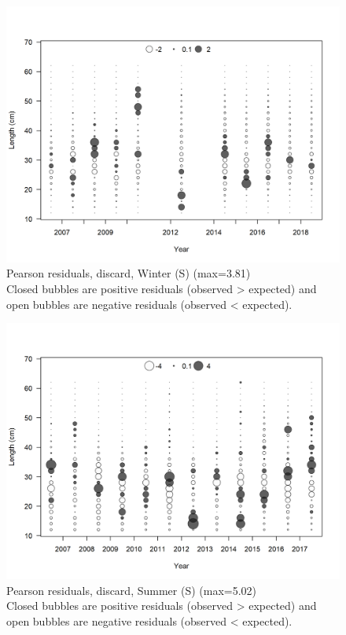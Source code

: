 \documentclass[12pt,]{article}
\begin{document}
\begin{figure}
\centering
\includegraphics{r4ss/plots_mod1/comp_lenfit_residsflt3mkt1.png}
\caption{Pearson residuals, discard, Winter (S) (max=3.81)\\
Closed bubbles are positive residuals (observed \textgreater{} expected)
and open bubbles are negative residuals (observed \textless{} expected).
\label{fig:discard_ws_len_pearson}}
\end{figure}

\begin{figure}
\centering
\includegraphics{r4ss/plots_mod1/comp_lenfit_residsflt4mkt1.png}
\caption{Pearson residuals, discard, Summer (S) (max=5.02)\\
Closed bubbles are positive residuals (observed \textgreater{} expected)
and open bubbles are negative residuals (observed \textless{} expected).
\label{fig:discard_ss_len_pearson}}
\end{figure}
\end{document}
